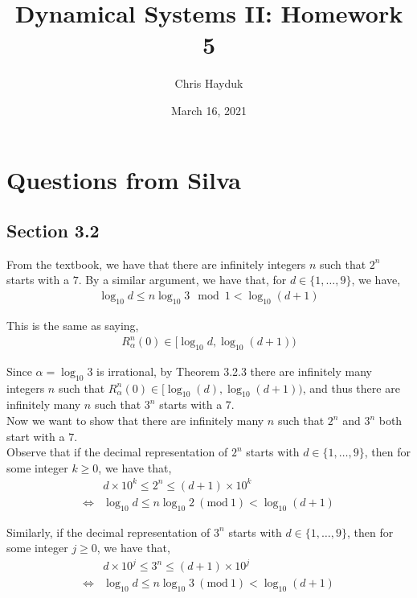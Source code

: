 \documentclass[12pt]{article}
\newenvironment{problem}[2][Problem]{\begin{trivlist}
\item[\hskip \labelsep {\bfseries #1}\hskip \labelsep {\bfseries #2.}]}{\end{trivlist}}
\newcommand{\Mod}[1]{\ (\mathrm{mod}\ #1)}
\begin{document}
\title{Dynamical Systems II: Homework 5}

\author{Chris Hayduk}
\date{March 16, 2021}

\maketitle

\section{Questions from Silva}

\subsection{Section 3.2}

\begin{problem}{10}
\end{problem}

From the textbook, we have that there are infinitely integers $n$ such that $2^n$ starts with a $7$. By a similar argument, we have that, for $d \in \{1, \ldots, 9\}$, we have,
\begin{align*}
\log_{10} d \leq n \log_{10} 3 \mod{1} < \log_{10}(d+1)
\end{align*}

This is the same as saying,
\begin{align*}
R_{\alpha}^n(0) \in [\log_{10} d, \log_{10}(d+1))
\end{align*}

Since $\alpha = \log_{10} 3$ is irrational, by Theorem 3.2.3 there are infinitely many integers $n$ such that $R^n_{\alpha}(0) \in [\log_{10}(d), \log_{10}(d+1))$, and thus there are infinitely many $n$ such that $3^n$ starts with a $7$.\\

Now we want to show that there are infinitely many $n$ such that $2^n$ and $3^n$ both start with a $7$.\\

Observe that if the decimal representation of $2^n$ starts with $d \in \{1, \ldots, 9\}$, then for some integer $k \geq 0$, we have that,
\begin{align}
&d \times 10^k \leq 2^n \leq (d+1) \times 10^k \nonumber \\
\iff &\log_{10} d \leq n \log_{10} 2 \Mod{1} < \log_{10}(d+1)
\end{align}

Similarly, if the decimal representation of $3^n$ starts with $d \in \{1, \ldots, 9\}$, then for some integer $j \geq 0$, we have that,
\begin{align}
&d \times 10^j \leq 3^n \leq (d+1) \times 10^j \nonumber \\
\iff &\log_{10} d \leq n \log_{10} 3 \Mod{1} < \log_{10}(d+1)
\end{align}
\end{document}
